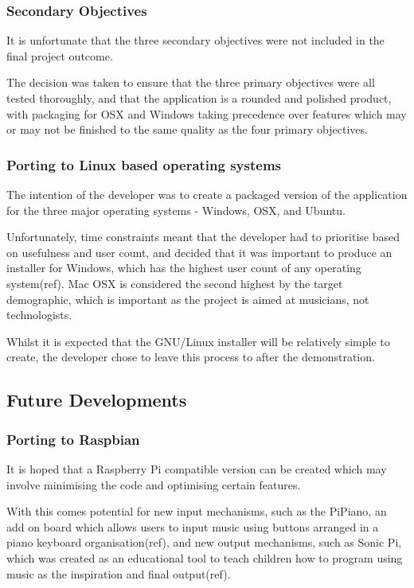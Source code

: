 \subsubsection{Secondary Objectives}
It is unfortunate that the three secondary objectives were not included in the final project outcome. 

The decision was taken to ensure that the three primary objectives were all tested thoroughly, and that the application is a rounded and polished product, with packaging for OSX and Windows taking precedence over features which may or may not be finished to the same quality as the four primary objectives.

\subsubsection{Porting to Linux based operating systems}
The intention of the developer was to create a packaged version of the application for the three major operating systems - Windows, OSX, and Ubuntu. 

Unfortunately, time constraints meant that the developer had to prioritise based on usefulness and user count, and decided that it was important to produce an installer for Windows, which has the highest user count of any operating system(ref). Mac OSX is considered the second highest by the target demographic, which is important as the project is aimed at musicians, not technologists.

Whilst it is expected that the GNU/Linux installer will be relatively simple to create, the developer chose to leave this process to after the demonstration.

\subsection{Future Developments}
\subsubsection{Porting to Raspbian}
It is hoped that a Raspberry Pi compatible version can be created which may involve minimising the code and optimising certain features. 

With this comes potential for new input mechanisms, such as the PiPiano, an add on board which allows users to input music using buttons arranged in a piano keyboard organisation(ref), and new output mechanisms, such as Sonic Pi, which was created as an educational tool to teach children how to program using music as the inspiration and final output(ref). 


